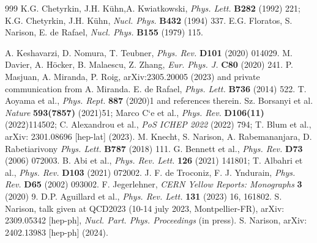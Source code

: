 \begin{thebibliography}{999}
 K.G. Chetyrkin, J.H. K\"uhn,A. Kwiatkowski, {\it Phys. Lett.} {\bf B282} (1992) 221; K.G. Chetyrkin, J.H. K\"uhn, {\it Nucl. Phys.} {\bf B432} (1994) 337.
E.G. Floratos, S. Narison, E. de Rafael, {\it Nucl. Phys.} {\bf B155} (1979) 115.

A. Keshavarzi, D. Nomura, T. Teubner, {\it Phys. Rev.} {\bf D101} (2020) 014029.
 M. Davier, A. H\"ocker, B. Malaescu,  Z. Zhang, {\it Eur. Phys. J.} {\bf C80} (2020) 241.
  P. Masjuan, A. Miranda, P. Roig, arXiv:2305.20005 (2023) and private communication from A. Miranda. 
  E. de Rafael, {\it Phys. Lett.} {\bf B736} (2014) 522.
 T. Aoyama et al., {\it  Phys. Rept.} {\bf 887} (2020)1 and references therein.
 Sz. Borsanyi et al. {\it  Nature} {\bf 593(7857)} (2021)51;  Marco C`e et al.,
{\it  Phys. Rev.} {\bf D106(11)} (2022)114502; C. Alexandrou et al., {\it PoS ICHEP 2022} (2022) 794; T. Blum et al., arXiv:  2301.08696 [hep-lat] (2023).
  M. Knecht, S. Narison, A. Rabemananjara, D. Rabetiarivony
 {\it Phys. Lett.} {\bf B787} (2018) 111.
  G. Bennett et al., {\it Phys. Rev.} {\bf D73} (2006) 072003.
    B. Abi et al., {\it Phys. Rev. Lett.} {\bf 126} (2021) 141801;  T. Albahri et al., {\it Phys. Rev.} {\bf  D103} (2021) 072002.
J. F. de Troconiz, F. J. Yndurain, {\it Phys. Rev.} {\bf D65} (2002) 093002.
 F. Jegerlehner, {\it CERN Yellow Reports: Monographs} {\bf 3} (2020) 9.
D.P. Aguillard et al., {\it Phys. Rev. Lett.} {\bf 131} (2023) 16, 161802. 
S. Narison, talk given at QCD2023 (10-14 july 2023, Montpellier-FR), arXiv: 2309.05342 [hep-ph], {\it Nucl. Part. Phys. Proceedings} (in press). 
S. Narison, arXiv:  2402.13983 [hep-ph] (2024).
\end{thebibliography}



